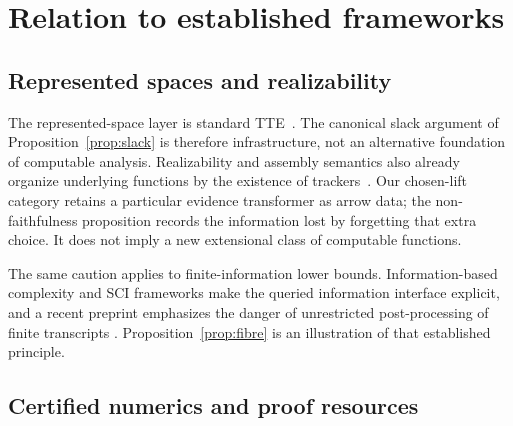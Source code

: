 \documentclass[11pt]{article}
\theoremstyle{definition}
\begin{document}
\section{Relation to established frameworks}\label{sec:related}

\subsection{Represented spaces and realizability}

The represented-space layer is standard TTE~\cite{Weihrauch,BrattkaHertling}.  The
canonical slack argument of Proposition~\ref{prop:slack} is therefore infrastructure, not
an alternative foundation of computable analysis.  Realizability and assembly semantics
also already organize underlying functions by the existence of trackers~\cite{vanOosten}.
Our chosen-lift category retains a particular evidence transformer as arrow data; the
non-faithfulness proposition records the information lost by forgetting that extra choice.  It
does not imply a new extensional class of computable functions.

The same caution applies to finite-information lower bounds.  Information-based
complexity and SCI frameworks make the queried information interface explicit, and a recent
preprint emphasizes the danger of unrestricted post-processing of finite transcripts
\cite{TWW,ColbrookHansen,Sorg2026}.  Proposition~\ref{prop:fibre} is an illustration of
that established principle.

\subsection{Certified numerics and proof resources}
\end{document}
